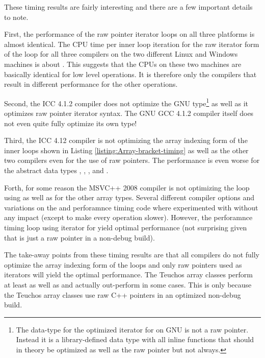 \documentclass[pdf,ps2pdf,11pt]{SANDreport}
\begin{document}
These timing results are fairly interesting and there are a few
important details to note.

First, the performance of the raw pointer iterator loops on all three
platforms is almost identical.  The CPU time per inner loop iteration
for the raw iterator form of the loop for all three compilers on the
two different Linux and Windows machines is about {}.
This suggests that the CPUs on these two machines are basically
identical for low level operations.  It is therefore only the
compilers that result in different performance for the other
operations.

Second, the ICC 4.1.2 compiler does not optimize the GNU
{} type\footnote{The data-type for the
optimized iterator for {} on GNU is not
a raw pointer.  Instead it is a library-defined data type with all
inline functions that should in theory be optimized as well as the raw
pointer but not always.} as well as it optimizes raw pointer iterator
syntax.  The GNU GCC 4.1.2 compiler itself does not even quite fully
optimize its own {} type!

Third, the ICC 4.12 compiler is not optimizing the array indexing form
of the inner loops shown in Listing
{}\ref{listing:Array-bracket-timing} as well as the other two
compilers even for the use of raw pointers.  The performance is even
worse for the abstract data types {},
{}, {}, and {}.

Forth, for some reason the MSVC++ 2008 compiler is not optimizing the
loop using {} as well as for
the other array types.  Several different compiler options and
variations on the {} and perforamnce timing code
where experimented with without any impact (except to make every
operation slower).  However, the perforamnce timing loop using
iterator for {} yield optimal performance (not
surprising given that {} is just a raw
pointer in a non-debug build).

The take-away points from these timing results are that all compilers
do not fully optimize the array indexing form of the loops and only
raw pointers used as iterators will yield the optimal performance.
The Teuchos array classes perform at least as well as
{} and actually out-perform {}
in some cases.  This is only because the Teuchos array classes use raw
C++ pointers in an optimized non-debug build.
\end{document}
